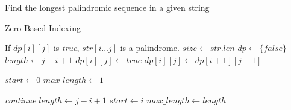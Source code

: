 \documentclass[12pt]{article}
\begin{document}
\begin{algorithm}

  \caption{Find the longest palindromic sequence in a given string}
  
  \begin{algorithmic}[1]
    \Ensure Zero Based Indexing
    \Statex
    
    \LeftComment If $dp[i][j]$ is \textit{true}, $str[i...j]$ is a palindrome.
            \State {}
        \EndIf
        \State $size \gets str.len$
        \State $dp \gets \{false\}$  
                \State $length \gets j-i+1$
                        \State $dp[i][j] \gets true$
                    \Else
                        \State $dp[i][j] \gets dp[i+1][j-1]$
                    \EndIf
                \EndIf
            \EndFor
        \EndFor
        
        \State $start \gets 0$
        \State $max\_length \gets 1$
        
                    \State \textit{continue}
                \EndIf
                \State $length \gets j-i+1$
                    \State $start \gets i$
                    \State $max\_length \gets length$
                \EndIf
            \EndFor
        \EndFor
        \State {}
    \EndFunction
  \end{algorithmic}
  
\end{algorithm}
\end{document}
